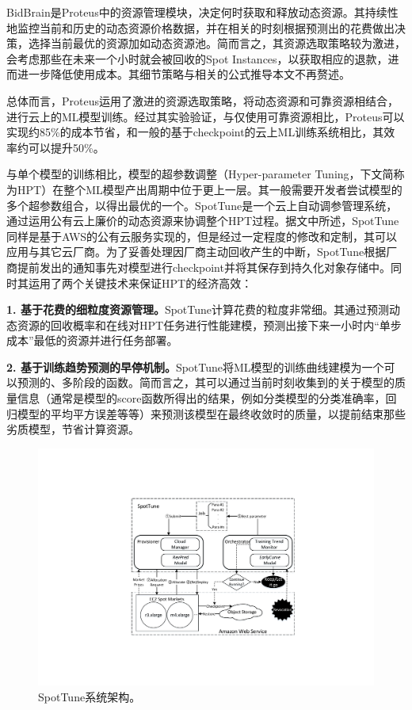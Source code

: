 BidBrain是Proteus中的资源管理模块，决定何时获取和释放动态资源。其持续性地监控当前和历史的动态资源价格数据，并在相关的时刻根据预测出的花费做出决策，选择当前最优的资源加如动态资源池。简而言之，其资源选取策略较为激进，会考虑那些在未来一个小时就会被回收的Spot Instances，以获取相应的退款，进而进一步降低使用成本。其细节策略与相关的公式推导本文不再赘述。

总体而言，Proteus运用了激进的资源选取策略，将动态资源和可靠资源相结合，进行云上的ML模型训练。经过其实验验证，与仅使用可靠资源相比，Proteus可以实现约85\%的成本节省，和一般的基于checkpoint的云上ML训练系统相比，其效率约可以提升50\%。

与单个模型的训练相比，模型的超参数调整（Hyper-parameter Tuning，下文简称为HPT）在整个ML模型产出周期中位于更上一层。其一般需要开发者尝试模型的多个超参数组合，以得出最优的一个。SpotTune是一个云上自动调参管理系统，通过运用公有云上廉价的动态资源来协调整个HPT过程。据文中所述，SpotTune同样是基于AWS的公有云服务实现的，但是经过一定程度的修改和定制，其可以应用与其它云厂商。为了妥善处理因厂商主动回收产生的中断，SpotTune根据厂商提前发出的通知事先对模型进行checkpoint并将其保存到持久化对象存储中。同时其运用了两个关键技术来保证HPT的经济高效：

\textbf{1. 基于花费的细粒度资源管理。}SpotTune计算花费的粒度非常细。其通过预测动态资源的回收概率和在线对HPT任务进行性能建模，预测出接下来一小时内“单步成本”最低的资源并进行任务部署。

\textbf{2. 基于训练趋势预测的早停机制。}SpotTune将ML模型的训练曲线建模为一个可以预测的、多阶段的函数。简而言之，其可以通过当前时刻收集到的关于模型的质量信息（通常是模型的score函数所得出的结果，例如分类模型的分类准确率，回归模型的平均平方误差等等）来预测该模型在最终收敛时的质量，以提前结束那些劣质模型，节省计算资源。

\begin{figure}[h]
    \centerline{\includegraphics[width=\textwidth]{figures/arch_spottune.pdf}}
    \caption{SpotTune系统架构。}
    \label{arch_spottune}
\end{figure}

